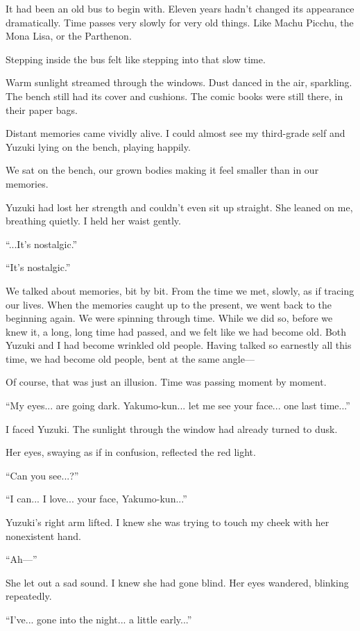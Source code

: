\documentclass[
    a4paper,
    12pt,
    twoside,
    openany,
    UTF8,
    fontset=windows
]{ctexbook}
\begin{document}
It had been an old bus to begin with. Eleven years hadn't changed its appearance dramatically. Time passes very slowly for very old things. Like Machu Picchu, the Mona Lisa, or the Parthenon.

Stepping inside the bus felt like stepping into that slow time.

Warm sunlight streamed through the windows. Dust danced in the air, sparkling. The bench still had its cover and cushions. The comic books were still there, in their paper bags.

Distant memories came vividly alive. I could almost see my third-grade self and Yuzuki lying on the bench, playing happily.

We sat on the bench, our grown bodies making it feel smaller than in our memories.

Yuzuki had lost her strength and couldn't even sit up straight. She leaned on me, breathing quietly. I held her waist gently.

``...It's nostalgic.''

``It's nostalgic.''

We talked about memories, bit by bit. From the time we met, slowly, as if tracing our lives. When the memories caught up to the present, we went back to the beginning again. We were spinning through time. While we did so, before we knew it, a long, long time had passed, and we felt like we had become old. Both Yuzuki and I had become wrinkled old people. Having talked so earnestly all this time, we had become old people, bent at the same angle---

Of course, that was just an illusion. Time was passing moment by moment.

``My eyes... are going dark. Yakumo-kun... let me see your face... one last time...''

I faced Yuzuki. The sunlight through the window had already turned to dusk.

Her eyes, swaying as if in confusion, reflected the red light.

``Can you see...?''

``I can... I love... your face, Yakumo-kun...''

Yuzuki's right arm lifted. I knew she was trying to touch my cheek with her nonexistent hand.

``Ah---''

She let out a sad sound. I knew she had gone blind. Her eyes wandered, blinking repeatedly.

``I've... gone into the night... a little early...''
\end{document}
